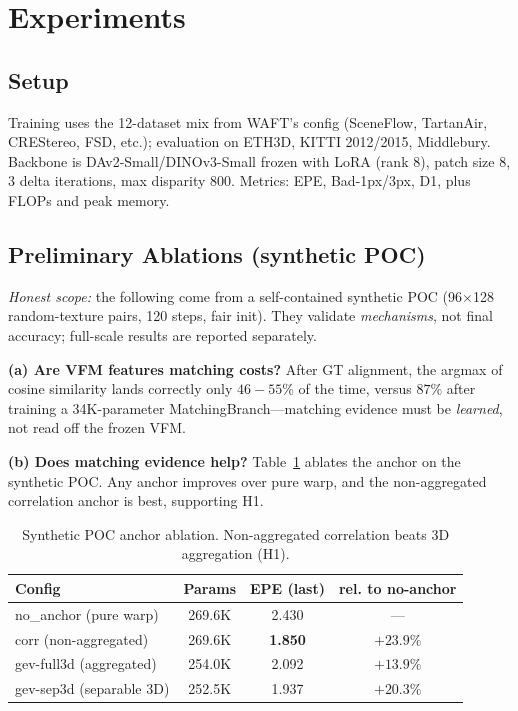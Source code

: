 \documentclass[conference]{IEEEtran}
\begin{document}
\section{Experiments}
\label{sec:exp}
\subsection{Setup}
Training uses the 12-dataset mix from WAFT's config (SceneFlow, TartanAir, CREStereo, FSD, etc.); evaluation on ETH3D, KITTI 2012/2015, Middlebury. Backbone is DAv2-Small/DINOv3-Small frozen with LoRA (rank 8), patch size 8, 3 delta iterations, max disparity 800. Metrics: EPE, Bad-1px/3px, D1, plus FLOPs and peak memory.

\subsection{Preliminary Ablations (synthetic POC)}
\emph{Honest scope:} the following come from a self-contained synthetic POC (96$\times$128 random-texture pairs, 120 steps, fair init). They validate \emph{mechanisms}, not final accuracy; full-scale results are reported separately.

\noindent\textbf{(a) Are VFM features matching costs?} After GT alignment, the argmax of cosine similarity lands correctly only $46{-}55\%$ of the time, versus $87\%$ after training a 34K-parameter MatchingBranch---matching evidence must be \emph{learned}, not read off the frozen VFM.

\noindent\textbf{(b) Does matching evidence help?} Table~\ref{tab:poc} ablates the anchor on the synthetic POC. Any anchor improves over pure warp, and the non-aggregated correlation anchor is best, supporting H1.

\begin{table}[t]
\centering
\caption{Synthetic POC anchor ablation. Non-aggregated correlation beats 3D aggregation (H1).}
\label{tab:poc}
\begin{tabular}{@{}lccc@{}}
\toprule
Config & Params & EPE (last) & rel. to no-anchor \\
\midrule
no\_anchor (pure warp) & 269.6K & 2.430 & --- \\
corr (non-aggregated) & 269.6K & \textbf{1.850} & \textbf{$+23.9\%$} \\
gev-full3d (aggregated) & 254.0K & 2.092 & $+13.9\%$ \\
gev-sep3d (separable 3D) & 252.5K & 1.937 & $+20.3\%$ \\
\bottomrule
\end{tabular}
\end{table}
\end{document}
